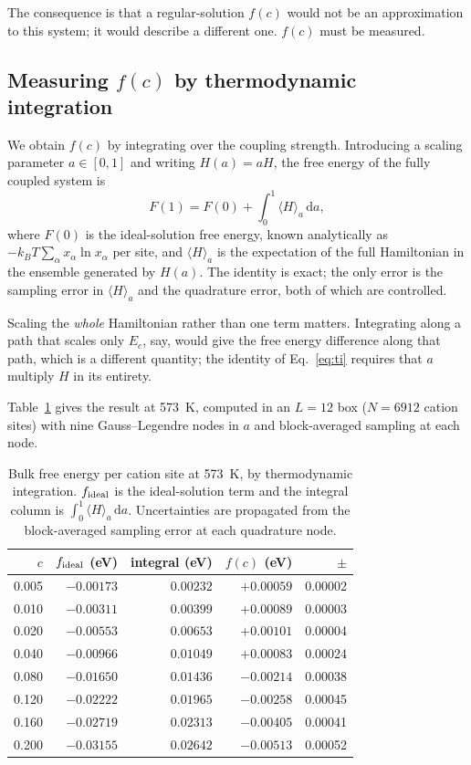 \documentclass[preprint,12pt,authoryear]{elsarticle}
\begin{document}
The consequence is that a regular-solution $f(c)$ would not be an approximation
to this system; it would describe a different one. $f(c)$ must be measured.

\subsection{Measuring $f(c)$ by thermodynamic integration}
\label{sec:fofc}

We obtain $f(c)$ by integrating over the coupling strength. Introducing a
scaling parameter $a \in [0,1]$ and writing $H(a) = aH$, the free energy of the
fully coupled system is
\begin{equation}
F(1) = F(0) + \int_0^1 \langle H \rangle_a \, \mathrm{d}a,
\label{eq:ti}
\end{equation}
where $F(0)$ is the ideal-solution free energy, known analytically as
$-k_BT \sum_\alpha x_\alpha \ln x_\alpha$ per site, and $\langle H \rangle_a$ is
the expectation of the full Hamiltonian in the ensemble generated by $H(a)$.
The identity is exact; the only error is the sampling error in
$\langle H \rangle_a$ and the quadrature error, both of which are controlled.

Scaling the \emph{whole} Hamiltonian rather than one term matters. Integrating
along a path that scales only $E_c$, say, would give the free energy difference
along that path, which is a different quantity; the identity of
Eq.~\eqref{eq:ti} requires that $a$ multiply $H$ in its entirety.

Table~\ref{tab:fofc} gives the result at 573~K, computed in an $L = 12$ box
($N = 6912$ cation sites) with nine Gauss--Legendre nodes in $a$ and
block-averaged sampling at each node.

\begin{table}[htbp]
\centering
\caption{Bulk free energy per cation site at 573~K, by thermodynamic
integration. $f_{\rm ideal}$ is the ideal-solution term and the integral column
is $\int_0^1 \langle H\rangle_a\,\mathrm{d}a$. Uncertainties are propagated from
the block-averaged sampling error at each quadrature node.}
\label{tab:fofc}
\small
\begin{tabular}{rrrrr}
\toprule
$c$ & $f_{\rm ideal}$ (eV) & integral (eV) & $f(c)$ (eV) & $\pm$ \\
\midrule
0.005 & $-0.00173$ & $0.00232$ & $+0.00059$ & 0.00002 \\
0.010 & $-0.00311$ & $0.00399$ & $+0.00089$ & 0.00003 \\
0.020 & $-0.00553$ & $0.00653$ & $+0.00101$ & 0.00004 \\
0.040 & $-0.00966$ & $0.01049$ & $+0.00083$ & 0.00024 \\
0.080 & $-0.01650$ & $0.01436$ & $-0.00214$ & 0.00038 \\
0.120 & $-0.02222$ & $0.01965$ & $-0.00258$ & 0.00045 \\
0.160 & $-0.02719$ & $0.02313$ & $-0.00405$ & 0.00041 \\
0.200 & $-0.03155$ & $0.02642$ & $-0.00513$ & 0.00052 \\
\bottomrule
\end{tabular}
\end{table}
\end{document}
